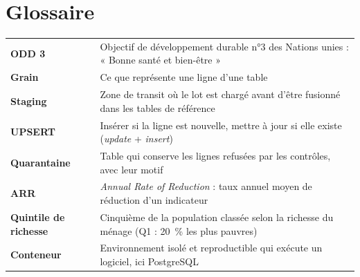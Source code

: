 \documentclass[11pt, a4paper, oneside, headings=normal, numbers=noenddot, DIV=12]{scrartcl}
\begin{document}
\section{Glossaire}
\begin{tabularx}{\linewidth}{@{}>{\bfseries}L{3.6cm} Y@{}}
ODD 3 & Objectif de développement durable n°3 des Nations unies : « Bonne santé et bien-être » \\
Grain & Ce que représente une ligne d'une table \\
Staging & Zone de transit où le lot est chargé avant d'être fusionné dans les tables de référence \\
UPSERT & Insérer si la ligne est nouvelle, mettre à jour si elle existe (\emph{update} + \emph{insert}) \\
Quarantaine & Table qui conserve les lignes refusées par les contrôles, avec leur motif \\
ARR & \emph{Annual Rate of Reduction} : taux annuel moyen de réduction d'un indicateur \\
Quintile de richesse & Cinquième de la population classée selon la richesse du ménage (Q1 : 20~\% les plus pauvres) \\
Conteneur & Environnement isolé et reproductible qui exécute un logiciel, ici PostgreSQL \\
\end{tabularx}
\end{document}

